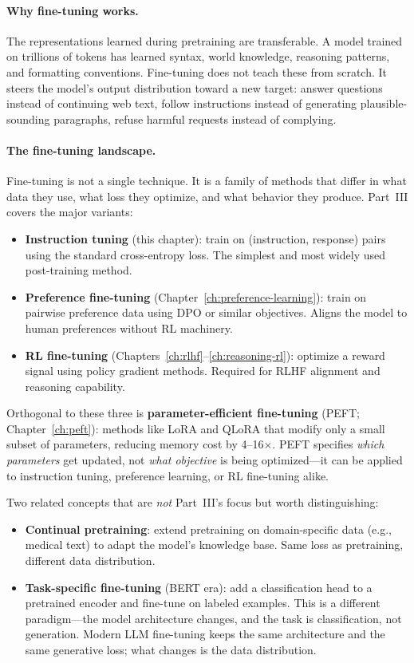 \paragraph{Why fine-tuning works.} The representations learned during pretraining are transferable. A model trained on trillions of tokens has learned syntax, world knowledge, reasoning patterns, and formatting conventions. Fine-tuning does not teach these from scratch. It steers the model's output distribution toward a new target: answer questions instead of continuing web text, follow instructions instead of generating plausible-sounding paragraphs, refuse harmful requests instead of complying.

\paragraph{The fine-tuning landscape.} Fine-tuning is not a single technique. It is a family of methods that differ in what data they use, what loss they optimize, and what behavior they produce. Part~III covers the major variants:

\begin{itemize}[nosep]
  \item \textbf{Instruction tuning} (this chapter): train on (instruction, response) pairs using the standard cross-entropy loss. The simplest and most widely used post-training method.
  \item \textbf{Preference fine-tuning} (Chapter~\ref{ch:preference-learning}): train on pairwise preference data using DPO or similar objectives. Aligns the model to human preferences without RL machinery.
  \item \textbf{RL fine-tuning} (Chapters~\ref{ch:rlhf}--\ref{ch:reasoning-rl}): optimize a reward signal using policy gradient methods. Required for RLHF alignment and reasoning capability.
\end{itemize}

Orthogonal to these three is \textbf{parameter-efficient fine-tuning} (PEFT; Chapter~\ref{ch:peft}): methods like LoRA and QLoRA that modify only a small subset of parameters, reducing memory cost by 4--16$\times$. PEFT specifies \emph{which parameters} get updated, not \emph{what objective} is being optimized---it can be applied to instruction tuning, preference learning, or RL fine-tuning alike.

Two related concepts that are \emph{not} Part~III's focus but worth distinguishing:

\begin{itemize}[nosep]
  \item \textbf{Continual pretraining}: extend pretraining on domain-specific data (e.g., medical text) to adapt the model's knowledge base. Same loss as pretraining, different data distribution.
  \item \textbf{Task-specific fine-tuning} (BERT era): add a classification head to a pretrained encoder and fine-tune on labeled examples. This is a different paradigm---the model architecture changes, and the task is classification, not generation. Modern LLM fine-tuning keeps the same architecture and the same generative loss; what changes is the data distribution.
\end{itemize}

